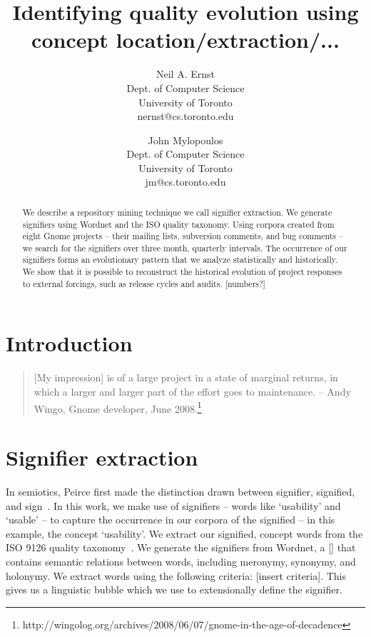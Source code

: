 \documentclass[conference, compsoc]{IEEEtran}
\begin{document}


\title{Identifying quality evolution using concept location/extraction/...}
\author{
Neil A. Ernst\\Dept. of Computer Science\\University of Toronto\\nernst@cs.toronto.edu \and
John Mylopoulos\\Dept. of Computer Science\\University of Toronto\\jm@cs.toronto.edu }

\maketitle

\begin{abstract}
We describe a repository mining technique we call signifier extraction. We generate signifiers using Wordnet and the ISO quality taxonomy. Using corpora created from eight Gnome projects -- their mailing lists, subversion comments, and bug comments -- we search for the signifiers over three month, quarterly intervals. The occurrence of our signifiers forms an evolutionary pattern that we analyze statistically and historically. We show that it is possible to reconstruct the historical evolution of project responses to external forcings, such as release cycles and audits. [numbers?]
\end{abstract}

\section{Introduction}\label{sect:introduction}
\begin{quote}[My impression] is of a large project in a state of marginal returns, in which a larger and larger part of the effort goes to maintenance. -- Andy Wingo, Gnome developer, June 2008.\footnote{http://wingolog.org/archives/2008/06/07/gnome-in-the-age-of-decadence}\end{quote}
	
\section{Signifier extraction}
In semiotics, Peirce first made the distinction drawn between signifier, signified, and sign~\cite{atkin2006}. In this work, we make use of signifiers -- words like `usability' and `usable' -- to capture the occurrence in our corpora of the signified -- in this example, the concept `usability'. We extract our signified, concept words from the ISO 9126 quality taxonomy~\cite{iso9126}. We generate the signifiers from Wordnet, a [] that contains semantic relations between words, including meronymy, synonymy, and holonymy. We extract words using the following criteria: [insert criteria]. This gives us a linguistic bubble which we use to extensionally define the signifier.

\begin{footnotesize}

\end{footnotesize}
\end{document}
